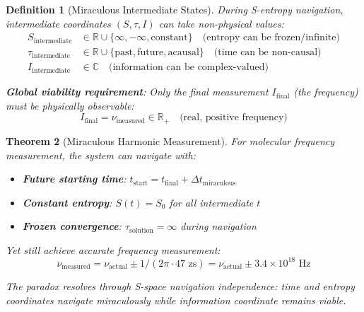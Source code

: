 \documentclass[12pt,a4paper]{article}
\newtheorem{theorem}{Theorem}[section]
\newtheorem{definition}[theorem]{Definition}
\begin{document}
\begin{definition}[Miraculous Intermediate States]
During S-entropy navigation, intermediate coordinates $(S, \tau, I)$ can take non-physical values:
\begin{align}
S_{\text{intermediate}} &\in \mathbb{R} \cup \{\infty, -\infty, \text{constant}\} \quad \text{(entropy can be frozen/infinite)} \\
\tau_{\text{intermediate}} &\in \mathbb{R} \cup \{\text{past}, \text{future}, \text{acausal}\} \quad \text{(time can be non-causal)} \\
I_{\text{intermediate}} &\in \mathbb{C} \quad \text{(information can be complex-valued)}
\end{align}

\textbf{Global viability requirement}: Only the final measurement $I_{\text{final}}$ (the frequency) must be physically observable:
\begin{equation}
I_{\text{final}} = \nu_{\text{measured}} \in \mathbb{R}_+ \quad \text{(real, positive frequency)}
\end{equation}
\end{definition}

\begin{theorem}[Miraculous Harmonic Measurement]
For molecular frequency measurement, the system can navigate with:
\begin{itemize}
\item \textbf{Future starting time}: $t_{\text{start}} = t_{\text{final}} + \Delta t_{\text{miraculous}}$
\item \textbf{Constant entropy}: $S(t) = S_0$ for all intermediate $t$
\item \textbf{Frozen convergence}: $\tau_{\text{solution}} = \infty$ during navigation
\end{itemize}

Yet still achieve accurate frequency measurement:
\begin{equation}
\nu_{\text{measured}} = \nu_{\text{actual}} \pm 1/(2\pi \cdot 47 \text{ zs}) = \nu_{\text{actual}} \pm 3.4 \times 10^{18} \text{ Hz}
\end{equation}

The paradox resolves through S-space navigation independence: time and entropy coordinates navigate miraculously while information coordinate remains viable.
\end{theorem}
\end{document}
